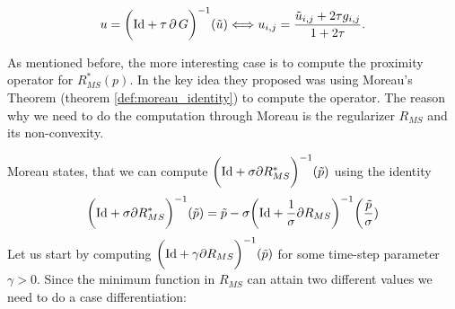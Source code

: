             \begin{equation}
                u = \bigg( \textnormal{Id} + \tau\,\partial\,G \bigg)^{-1}(\tilde{u}) \Longleftrightarrow u_{i,j} = \frac{\tilde{u}_{i,j} + 2\tau g_{i,j}}{1 + 2\tau}.
            \label{eq:proximity_operator_G}
            \end{equation}

        As mentioned before, the more interesting case is to compute the proximity operator for $R_{MS}^{\ast}(p)$. In \cite{Strekalovskiy-Cremers-eccv14} the key idea they proposed was using Moreau's Theorem (theorem \ref{def:moreau_identity}) to compute the operator. The reason why we need to do the computation through Moreau is the regularizer $R_{MS}$ and its non-convexity. 

        Moreau states, that we can compute $\bigg( \textnormal{Id} + \sigma \partial R_{MS}^{\ast} \bigg)^{-1}(\tilde{p})$ using the identity
            \begin{equation}
                \bigg( \textnormal{Id} + \sigma \partial R_{MS}^{\ast} \bigg)^{-1}(\tilde{p}) = \tilde{p} - \sigma \bigg( \textnormal{Id} + \frac{1}{\sigma} \partial R_{MS} \bigg)^{-1} \bigg(\frac{\tilde{p}}{\sigma}) \bigg.
            \label{eq:moreau_mumford_shah_regularizer}
            \end{equation}
        Let us start by computing $\bigg( \textnormal{Id} + \gamma\partial R_{MS} \bigg)^{-1}(\tilde{p})$ for some time-step parameter $\gamma > 0$. Since the minimum function in $R_{MS}$ can attain two different values we need to do a case differentiation:
